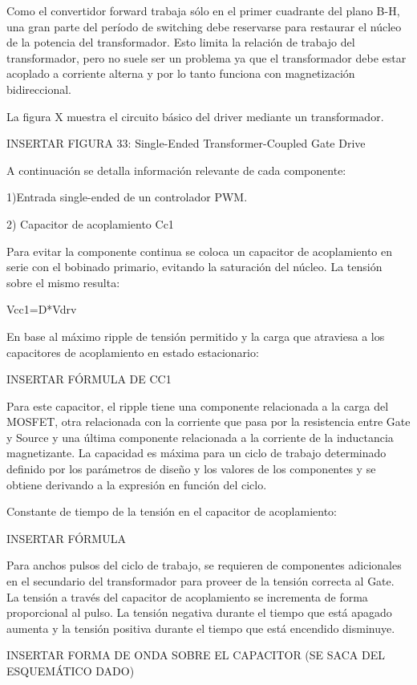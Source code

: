 Como el convertidor forward trabaja sólo en el primer cuadrante del plano B-H, una gran parte del período de switching debe reservarse para restaurar el núcleo de la potencia del transformador. 
Esto limita la relación de trabajo del transformador, pero no suele ser un problema ya que 
el transformador debe estar acoplado a corriente alterna y por lo tanto funciona con magnetización bidireccional. 

La figura X muestra el circuito básico del driver mediante un transformador. 

INSERTAR FIGURA 33: Single-Ended Transformer-Coupled Gate Drive

A continuación se detalla información relevante de cada componente: 

1)Entrada single-ended de un controlador PWM.

2) Capacitor de acoplamiento Cc1

Para evitar la componente continua se coloca un capacitor de acoplamiento en serie con el bobinado primario, 
evitando la saturación del núcleo. La tensión sobre el mismo resulta: 

Vcc1=D*Vdrv

En base al máximo ripple de tensión permitido y la carga que atraviesa a los capacitores de acoplamiento en estado estacionario:

INSERTAR FÓRMULA DE CC1

Para este capacitor, el ripple tiene una componente relacionada a la carga del MOSFET, 
otra relacionada con la corriente que pasa por la resistencia entre Gate y Source 
y una última componente relacionada a la corriente de la inductancia magnetizante. 
La capacidad es máxima para un ciclo de trabajo determinado definido por los parámetros de diseño 
y los valores de los componentes y se obtiene derivando a la expresión en función del ciclo. 

Constante de tiempo de la tensión en el capacitor de acoplamiento:

INSERTAR FÓRMULA

Para anchos pulsos del ciclo de trabajo, se requieren de componentes adicionales 
en el secundario del transformador para proveer de la tensión correcta al Gate. 
La tensión a través del capacitor de acoplamiento se incrementa de forma proporcional al pulso. 
La tensión negativa durante el tiempo que está apagado aumenta y la tensión positiva durante el tiempo que está encendido disminuye. 

INSERTAR FORMA DE ONDA SOBRE EL CAPACITOR (SE SACA DEL ESQUEMÁTICO DADO)

